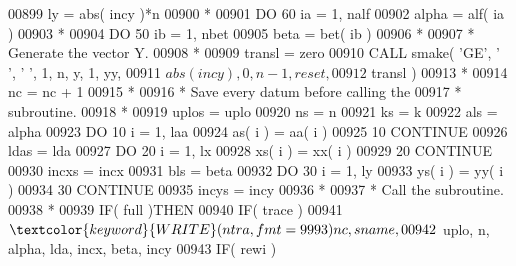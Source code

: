 \begin{DoxyCode}
00899                      ly = abs( incy )*n
00900 \textcolor{comment}{*}
00901                      \textcolor{keywordflow}{DO} 60 ia = 1, nalf
00902                         alpha = alf( ia )
00903 \textcolor{comment}{*}
00904                         \textcolor{keywordflow}{DO} 50 ib = 1, nbet
00905                            beta = bet( ib )
00906 \textcolor{comment}{*}
00907 \textcolor{comment}{*                          Generate the vector Y.}
00908 \textcolor{comment}{*}
00909                            transl = zero
00910                            \textcolor{keyword}{CALL }smake( \textcolor{stringliteral}{'GE'}, \textcolor{stringliteral}{' '}, \textcolor{stringliteral}{' '}, 1, n, y, 1, yy,
00911      $                                 abs( incy ), 0, n - 1, reset,
00912      $                                 transl )
00913 \textcolor{comment}{*}
00914                            nc = nc + 1
00915 \textcolor{comment}{*}
00916 \textcolor{comment}{*                          Save every datum before calling the}
00917 \textcolor{comment}{*                          subroutine.}
00918 \textcolor{comment}{*}
00919                            uplos = uplo
00920                            ns = n
00921                            ks = k
00922                            als = alpha
00923                            \textcolor{keywordflow}{DO} 10 i = 1, laa
00924                               as( i ) = aa( i )
00925    10                      \textcolor{keywordflow}{CONTINUE}
00926                            ldas = lda
00927                            \textcolor{keywordflow}{DO} 20 i = 1, lx
00928                               xs( i ) = xx( i )
00929    20                      \textcolor{keywordflow}{CONTINUE}
00930                            incxs = incx
00931                            bls = beta
00932                            \textcolor{keywordflow}{DO} 30 i = 1, ly
00933                               ys( i ) = yy( i )
00934    30                      \textcolor{keywordflow}{CONTINUE}
00935                            incys = incy
00936 \textcolor{comment}{*}
00937 \textcolor{comment}{*                          Call the subroutine.}
00938 \textcolor{comment}{*}
00939                            \textcolor{keywordflow}{IF}( full )\textcolor{keywordflow}{THEN}
00940                               \textcolor{keywordflow}{IF}( trace )
00941      $                           \textcolor{keyword}{WRITE}( ntra, fmt = 9993 )nc, sname,
00942      $                           uplo, n, alpha, lda, incx, beta, incy
00943                               \textcolor{keywordflow}{IF}( rewi )

\end{DoxyCode}
